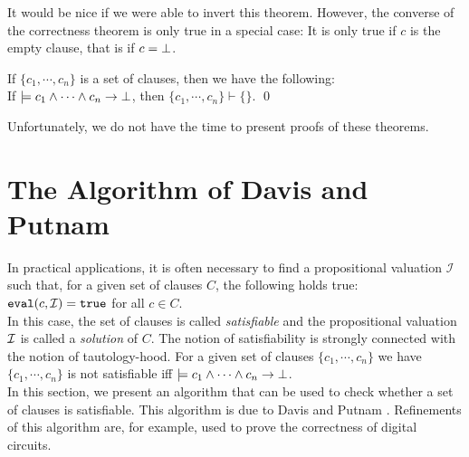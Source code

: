 \noindent
It would be nice if we were able to invert this theorem.  However,
the converse of the correctness theorem is only true in a special case: It is only true if
$c$ is the empty clause, that is if $c = \bot$.

\begin{Proposition} \label{widerlegungs-vollstaendig}
If  $\{c_1, \cdots, c_n \}$ is a set of clauses, then we have the following: 
\\[0.2cm]
\hspace*{1.3cm} 
If $\models c_1 \wedge \cdots \wedge c_n \rightarrow \bot$, \quad then $\{c_1, \cdots, c_n \}
\vdash \{\}$. \qed
\end{Proposition}

\noindent
Unfortunately, we do not have the time to present proofs of these theorems.


\section{The Algorithm of  Davis and Putnam}
In practical applications, it is often necessary to find a propositional valuation $\mathcal{I}$
such that, for a given set of clauses  $C$, the following holds true:
\\[0.2cm]
\hspace*{1.3cm} 
$\mathtt{eval}(c,\mathcal{I}) = \mathtt{true}$ \quad for all $c\in C$. 
\\[0.2cm]
In this case, the set of clauses is called \emph{satisfiable} and the propositional valuation
$\mathcal{I}$ is called a  \emph{solution} of $C$.  The notion of satisfiability is strongly connected with
the notion of tautology-hood.  For a given set of clauses $\{ c_1, \cdots, c_n \}$ we have
\\[0.2cm]
\hspace*{1.3cm}
$\{ c_1, \cdots, c_n \}$ is not satisfiable \quad iff \quad
$\models c_1 \wedge \cdots \wedge c_n \rightarrow \bot$.
\\[0.2cm]
In this section, we present an algorithm that can be used to check whether a set of clauses is
satisfiable.  This algorithm is due to  Davis and Putnam \cite{davis62}.  
Refinements of this algorithm are, for example, used to prove the correctness of digital circuits.

